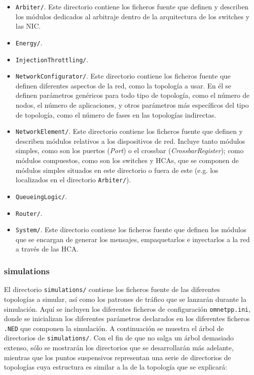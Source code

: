 \begin{itemize}
    \item \verb|Arbiter/|. Este directorio contiene los ficheros fuente que definen y describen los módulos dedicados al arbitraje dentro de la arquitectura de los switches y las NIC.
    \item \verb|Energy/|.
    \item \verb|InjectionThrottling/|.
    \item \verb|NetworkConfigurator/|. Este directorio contiene los ficheros fuente que definen diferentes aspectos de la red, como la topología a usar. En él se definen parámetros genéricos para todo tipo de topología, como el número de nodos, el número de aplicaciones, y otros parámetros más específicos del tipo de topología, como el número de fases en las topologías indirectas.
    \item \verb|NetworkElement/|. Este directorio contiene los ficheros fuente que definen y describen módulos relativos a los dispositivos de red. Incluye tanto módulos simples, como son los puertos (\emph{Port}) o el crossbar (\emph{CrossbarRegister}); como módulos compuestos, como son los switches y HCAs, que se componen de módulos simples situados en este directorio o fuera de este (e.g. los localizados en el directorio \verb|Arbiter/|).
    \item \verb|QueueingLogic/|.
    \item \verb|Router/|.
    \item \verb|System/|. Este directorio contiene los ficheros fuente que definen los módulos que se encargan de generar los mensajes, empaquetarlos e inyectarlos a la red a través de las HCA.
\end{itemize}


\subsubsection{simulations}\label{sec:simulations}
El directorio \verb|simulations/| contiene los ficheros fuente de las diferentes topologías a simular, así como los patrones de tráfico que se lanzarán durante la simulación. Aquí se incluyen los diferentes ficheros de configuración \verb|omnetpp.ini|, donde se inicializan los diferentes parámetros declarados en los diferentes ficheros \verb|.NED| que componen la simulación. A continuación se muestra el árbol de directorios de \verb|simulations/|. Con el fin de que no salga un árbol demasiado extenso, sólo se mostrarán los directorios que se desarrollarán más adelante, mientras que los puntos suspensivos representan una serie de directorios de topologías cuya estructura es similar a la de la topología que se explicará:\\

